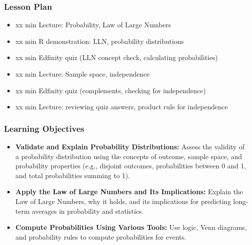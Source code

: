 \begin{frame}
    \frametitle{Lesson Plan}
    \begin{itemize}
        \item xx min Lecture: Probability, Law of Large Numbers
        \item xx min R demonstration: LLN, probability distributions
        \item xx min Edfinity quiz (LLN concept check, calculating probabilities)
        \item xx min Lecture: Sample space, independence
        \item xx min Edfinity quiz (complements, checking for independence)
        \item xx min Lecture: reviewing quiz answers, product rule for independence
    \end{itemize}
    \end{frame}
    
    \begin{frame}
    \frametitle{Learning Objectives}
    \begin{itemize}
        \item \textbf{Validate and Explain Probability Distributions:} Assess the validity of a probability distribution using the concepts of outcome, sample space, and probability properties (e.g., disjoint outcomes, probabilities between 0 and 1, and total probabilities summing to 1).
        \item \textbf{Apply the Law of Large Numbers and Its Implications:} Explain the Law of Large Numbers, why it holds, and its implications for predicting long-term averages in probability and statistics.
        \item \textbf{Compute Probabilities Using Various Tools:} Use logic, Venn diagrams, and probability rules to compute probabilities for events.
    \end{itemize}
    \end{frame}